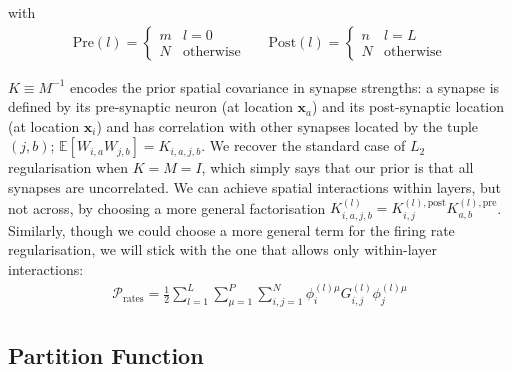 \documentclass[../main.tex]{subfiles}
\begin{document}
with 
\begin{align*}
  \text{Pre}(l) = \begin{cases}
    m & l = 0 \\
    N & \text{otherwise}
  \end{cases}
  &&
  \text{Post}(l) = \begin{cases}
    n & l = L \\
    N & \text{otherwise}
  \end{cases}
\end{align*}

$K \equiv M^{-1}$ encodes the prior spatial covariance in synapse strengths: a synapse is defined by its pre-synaptic neuron (at location $\mathbf{x}_a$) and its post-synaptic location (at location $\mathbf{x}_i$) and has correlation with other synapses located by the tuple $(j,b)$; $\mathbb{E}[W_{i,a} W_{j,b}] = K_{i,a,j,b}$. We recover the standard case of $L_2$ regularisation when $K = M = I$, which simply says that our prior is that all synapses are uncorrelated. We can achieve spatial interactions within layers, but not across, by choosing a more general factorisation $K^{(l)}_{i,a,j,b} = K^{(l),\text{post}}_{i,j} K^{(l),\text{pre}}_{a,b}$.
Similarly, though we could choose a more general term for the firing rate regularisation, we will stick with the one that allows only within-layer interactions:
\begin{align*}
  \mathcal{P}_{\text{rates}} = 
    \frac12 \sum_{l=1}^{L} \sum_{\mu=1}^P \sum_{i,j=1}^N \phi^{(l)\mu}_{i} G^{(l)}_{i,j} \phi^{(l)\mu}_{j}
\end{align*}

\subsection{Partition Function}
\end{document}
